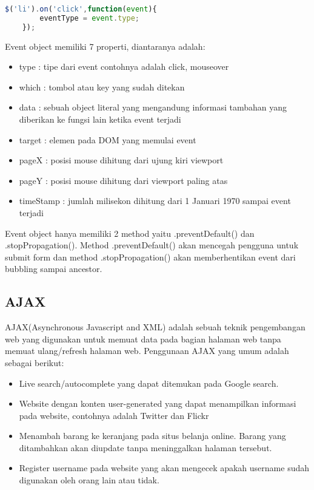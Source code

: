 \begin{lstlisting}[language=Javascript, caption=Mendapatkan tipe event dari event object, label={lst:jQuery11}]
	$('li').on('click',function(event){
		eventType = event.type;
	});
\end{lstlisting}

Event object memiliki 7 properti, diantaranya adalah:

\begin{itemize}
	\item type : tipe dari event contohnya adalah click, mouseover
	\item which : tombol atau key yang sudah ditekan
	\item data : sebuah object literal yang mengandung informasi tambahan yang diberikan ke fungsi lain ketika event terjadi
	\item target : elemen pada DOM yang memulai event
	\item pageX : posisi mouse dihitung dari ujung kiri viewport 
	\item pageY : posisi mouse dihitung dari viewport paling atas
	\item timeStamp : jumlah milisekon dihitung dari 1 Januari 1970 sampai event terjadi
\end{itemize}

Event object hanya memiliki 2 method yaitu .preventDefault() dan .stopPropagation(). Method .preventDefault() akan mencegah pengguna untuk submit form dan method .stopPropagation() akan memberhentikan event dari bubbling sampai ancestor.

\subsection{AJAX}
AJAX(Asynchronous Javascript and XML) adalah sebuah teknik pengembangan web yang digunakan untuk memuat data pada bagian halaman web tanpa memuat ulang/refresh halaman web. Penggunaan AJAX yang umum adalah sebagai berikut:

\begin{itemize}
	\item Live search/autocomplete yang dapat ditemukan pada Google search.
	\item Website dengan konten user-generated yang dapat menampilkan informasi pada website, contohnya adalah Twitter dan Flickr
	\item Menambah barang ke keranjang pada situs belanja online. Barang yang ditambahkan akan diupdate tanpa meninggalkan halaman tersebut.
	\item Register username pada website yang akan mengecek apakah username sudah digunakan oleh orang lain atau tidak.
\end{itemize}


